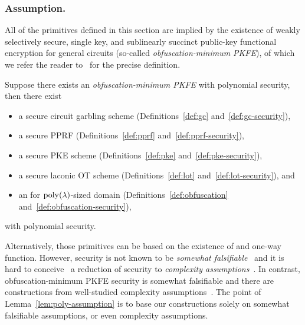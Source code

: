 \subsubsection{Assumption.}
All of the primitives defined in this section are implied by the existence of
weakly selectively secure, single key, and sublinearly succinct
public-key functional encryption for general circuits
(so-called \emph{obfuscation-minimum PKFE}),
of which we refer the reader to~\cite{C:KNTY19} for the precise definition.

\begin{lemma}\label{lem:poly-assumption}
Suppose there exists an \emph{obfuscation-minimum PKFE} with polynomial security, then there exist
\begingroup
{}
\begin{itemize}
\item {}
a secure circuit garbling scheme (Definitions~\ref{def:gc} and~\ref{def:gc-security}),
\item {}
a secure PPRF (Definitions~\ref{def:pprf} and~\ref{def:pprf-security}),
\item {}
a secure PKE scheme (Definitions~\ref{def:pke} and~\ref{def:pke-security}),
\item {}
a secure laconic OT scheme (Definitions~\ref{def:lot} and~\ref{def:lot-security}), and
\item {}
an {\iO} for $\operatorname{poly}(\lambda)$-sized domain (Definitions~\ref{def:obfuscation} and~\ref{def:obfuscation-security}),
\end{itemize}
with polynomial security.
\endgroup
\end{lemma}

\noindent
Alternatively, those primitives can be based on the existence of {\iO} and one-way function.
However, {\iO} security is not known to be \emph{somewhat falsifiable}~\cite{C:Naor03} and it is hard to conceive~\cite{STOC:GGSW13} a reduction of {\iO} security to \emph{complexity assumptions}~\cite{TCC:GolKal16}.
In contrast, obfuscation-minimum PKFE security is somewhat falsifiable and there are constructions from well-studied complexity assumptions~\cite{STOC:JaiLinSah21,EPRINT:JaiLinSah21corrected}.
The point of Lemma~\ref{lem:poly-assumption} is to base our constructions solely on somewhat falsifiable assumptions, or even complexity assumptions.
